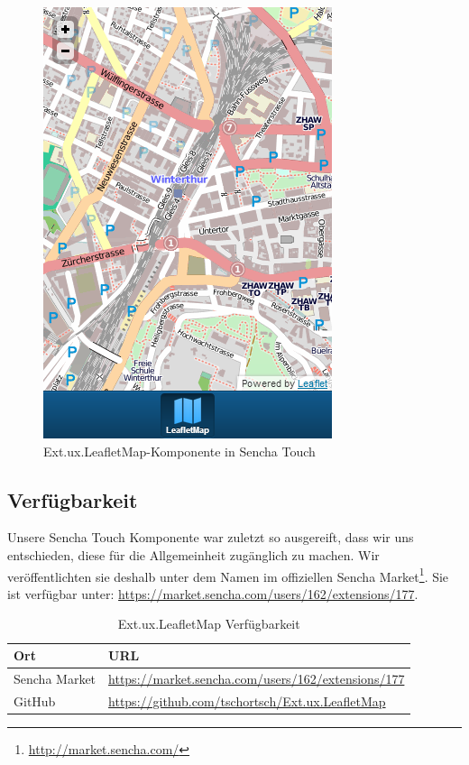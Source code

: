 \begin{figure}[H]
	\centering
	\includegraphics[scale=0.5]{images/implementation/frontend/leafletmap-screenshot}
	\caption{Ext.ux.LeafletMap-Komponente in Sencha Touch}
	\label{image-leafletmap-screenshot}
\end{figure}

\subsection{Verfügbarkeit}
Unsere Sencha Touch Komponente war zuletzt so ausgereift, dass wir uns entschieden, diese für die Allgemeinheit zugänglich zu machen.
Wir veröffentlichten sie deshalb unter dem Namen  im offiziellen Sencha Market\footnote{\url{http://market.sencha.com/}}.
Sie ist verfügbar unter: \url{https://market.sencha.com/users/162/extensions/177}.

\begin{table}[H]
\centering
\begin{tabular}{|p{0.2\twocelltabwidth}|p{0.8\twocelltabwidth}|}
\hline 
\textbf{Ort} & \textbf{URL} \\ 
\hline 
Sencha Market & \url{https://market.sencha.com/users/162/extensions/177} \\ 
\hline 
GitHub & \url{https://github.com/tschortsch/Ext.ux.LeafletMap} \\ 
\hline 
\end{tabular} 
\caption{Ext.ux.LeafletMap Verfügbarkeit}
\label{leafletmap-availiblity}
\end{table}

